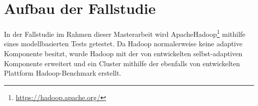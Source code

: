\chapter{Aufbau der Fallstudie}\label{sec:fallstudie}

In der Fallstudie im Rahmen dieser Masterarbeit wird Apache\texttrademark Hadoop\textregistered\footnote{\url{https://hadoop.apache.org/}} mithilfe eines modellbasierten Tests getestet. Da Hadoop normalerweise keine adaptive Komponente besitzt, wurde Hadoop mit der von \citeauthor{zhang2016} entwickelten selbst-adaptiven Komponente erweitert und ein Cluster mithilfe der ebenfalls von \citeauthor{zhang2016} entwickelten Plattform Hadoop-Benchmark erstellt.

%






